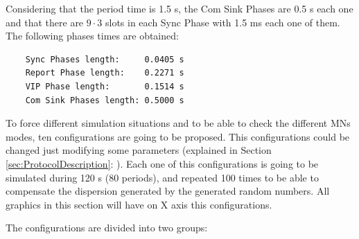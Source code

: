 Considering that the period time is 1.5 s, the Com Sink Phases are 0.5 s each one and that there are $9\cdot3$ slots in each Sync Phase with 1.5 ms each one
of them. The following phases times are obtained:

\begin{verbatim}
    Sync Phases length:     0.0405 s
    Report Phase length:    0.2271 s
    VIP Phase length:       0.1514 s
    Com Sink Phases length: 0.5000 s
\end{verbatim}

To force different simulation situations and to be able to check the different \acp{MN} modes, ten configurations are going to be proposed. This 
configurations could be changed just modifying some parameters (explained in Section \ref{sec:ProtocolDescription}: ). 
Each one of this configurations is going to be simulated during 120 s (80 periods), and repeated 100 times to be able to compensate the dispersion 
generated by the generated random numbers. All graphics in this section will have on X axis this configurations.

The configurations are divided into two groups:

